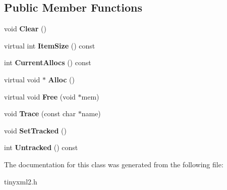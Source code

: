 \subsection*{Public Member Functions}
\begin{DoxyCompactItemize}
\item 
\mbox{\label{classtinyxml2_1_1_mem_pool_t_a22d595caa0e9d23aa080f49ca6475fdd}} 
void {\bfseries Clear} ()
\item 
\mbox{\label{classtinyxml2_1_1_mem_pool_t_a54e4d9b343459ef1731314a99877ff35}} 
virtual int {\bfseries Item\+Size} () const
\item 
\mbox{\label{classtinyxml2_1_1_mem_pool_t_a445a6c80151ba6268b24ec62a7c84d74}} 
int {\bfseries Current\+Allocs} () const
\item 
\mbox{\label{classtinyxml2_1_1_mem_pool_t_a810fd2b0caf56b8b688e55f2768f96c7}} 
virtual void $\ast$ {\bfseries Alloc} ()
\item 
\mbox{\label{classtinyxml2_1_1_mem_pool_t_a408ce0918e9d3d5e5e1cc4896944875f}} 
virtual void {\bfseries Free} (void $\ast$mem)
\item 
\mbox{\label{classtinyxml2_1_1_mem_pool_t_a47eefbd934ef70d973ea41d41ab5f239}} 
void {\bfseries Trace} (const char $\ast$name)
\item 
\mbox{\label{classtinyxml2_1_1_mem_pool_t_aee3c611215ae08cce41a940bf2763027}} 
void {\bfseries Set\+Tracked} ()
\item 
\mbox{\label{classtinyxml2_1_1_mem_pool_t_a3bcdc302ae15d2810e11192321a8f5f1}} 
int {\bfseries Untracked} () const
\end{DoxyCompactItemize}


The documentation for this class was generated from the following file\+:\begin{DoxyCompactItemize}
\item 
tinyxml2.\+h\end{DoxyCompactItemize}
